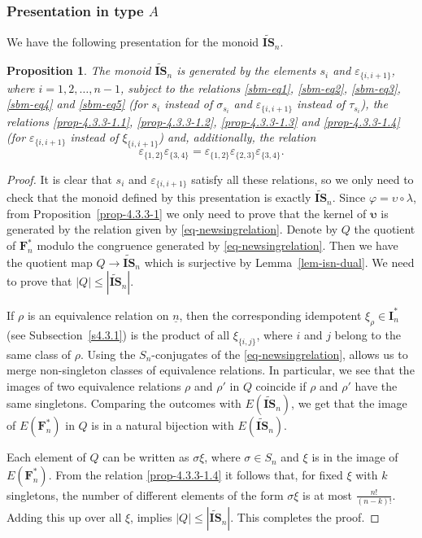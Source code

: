\documentclass[a4paper]{amsart}
\newtheorem{proposition}[theorem]{Proposition}
\begin{document}
\subsubsection{Presentation in type $A$}\label{s4.2.3}

We have the following presentation for the monoid $\widetilde{\mathbf{IS}}_n$.

\begin{proposition}\label{prop-4.2.3-1}
The monoid $\widetilde{\mathbf{IS}}_n$ is generated by the elements 
$s_i$ and $\varepsilon_{\{i,i+1\}}$, where $i=1,2,\dots,n-1$, subject to the relations
\eqref{sbm-eq1}, \eqref{sbm-eq2}, \eqref{sbm-eq3}, \eqref{sbm-eq4} and \eqref{sbm-eq5}
(for $s_i$  instead of $\sigma_{s_i}$ and $\varepsilon_{\{i,i+1\}}$ instead  of $\tau_{s_i}$),
the relations \eqref{prop-4.3.3-1.1}, \eqref{prop-4.3.3-1.2},
\eqref{prop-4.3.3-1.3} and \eqref{prop-4.3.3-1.4}
(for $\varepsilon_{\{i,i+1\}}$ instead  of $\xi_{\{i,i+1\}}$)
and,  additionally, the relation
\begin{equation}\label{eq-newsingrelation}
\varepsilon_{\{1,2\}}\varepsilon_{\{3,4\}}=\varepsilon_{\{1,2\}}\varepsilon_{\{2,3\}}\varepsilon_{\{3,4\}}.
\end{equation}
\end{proposition}

\begin{proof}
It is clear that $s_i$ and $\varepsilon_{\{i,i+1\}}$  satisfy all these relations, so we only need to  check
that the monoid defined by this presentation is exactly $\widetilde{\mathbf{IS}}_n$.
Since $\varphi={\upsilon}\circ \lambda$, from
Proposition~\ref{prop-4.3.3-1} we only need to prove that the kernel of 
$\boldsymbol{\upsilon}$ is generated by the relation given by \eqref{eq-newsingrelation}.
Denote by $Q$ the quotient of $\mathbf{F}^*_n$ modulo the congruence generated by \eqref{eq-newsingrelation}.
Then we have  the quotient map $Q\to \widetilde{\mathbf{IS}}_n$ which is surjective by
Lemma~\ref{lem-isn-dual}.
We need to prove that $|Q|\leq  |\widetilde{\mathbf{IS}}_n|$.

If $\rho$ is an equivalence relation  on $\underline{n}$, then the 
corresponding idempotent  $\xi_\rho\in\mathbf{I}^*_n$ 
(see Subsection~\ref{s4.3.1}) is the product of
all $\xi_{\{i,j\}}$, where $i$ and $j$ belong to the same class of $\rho$. Using the
$S_n$-conjugates of the \eqref{eq-newsingrelation}, allows us to merge non-singleton classes
of equivalence relations.  In particular, we see that the images of two equivalence relations
$\rho$ and $\rho'$ in $Q$ coincide if $\rho$ and $\rho'$ have the same singletons.
Comparing the outcomes with $E(\widetilde{\mathbf{IS}}_n)$, we get that
the image of $E(\mathbf{F}^*_n)$ in $Q$ is in a natural bijection with
$E(\widetilde{\mathbf{IS}}_n)$. 

Each element of $Q$ can be written as $\sigma\xi$, where $\sigma\in S_n$
and $\xi$ is in the image of $E(\mathbf{F}^*_n)$. From the 
relation \eqref{prop-4.3.3-1.4} it follows that,
for fixed $\xi$ with $k$ singletons, the number of different elements
of the form $\sigma\xi$ is at most $\frac{n!}{(n-k)!}$. Adding this up  over
all  $\xi$, implies $|Q|\leq  |\widetilde{\mathbf{IS}}_n|$. This completes the proof.
\end{proof}
\end{document}

